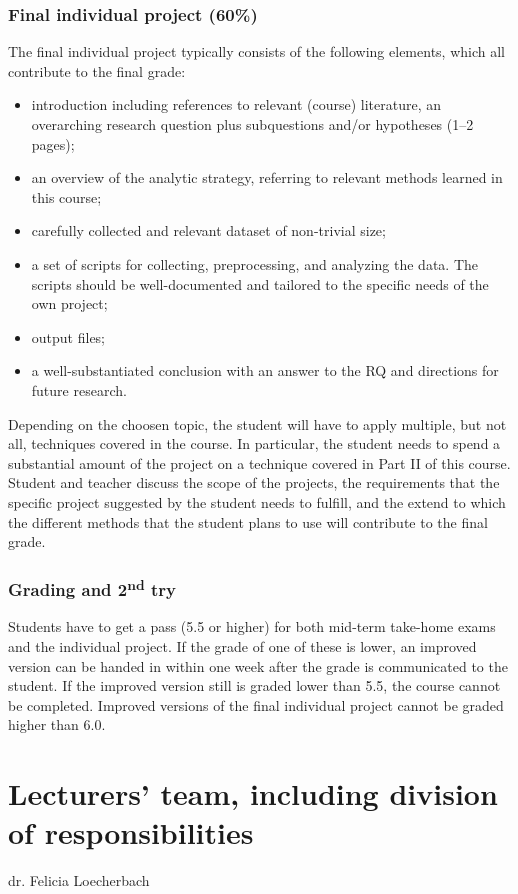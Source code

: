 \documentclass[a4paper,12pt]{report}
\begin{document}
\subsection*{Final individual project (60\%)}
The final individual project typically consists of the following elements, which all contribute to the final grade:
\begin{itemize}
\item introduction including references to relevant (course) literature, an overarching research question plus subquestions and/or hypotheses (1–2 pages);
\item an overview of the analytic strategy, referring to relevant methods learned in this course;
\item carefully collected and relevant dataset of non-trivial size;
\item a set of scripts for collecting, preprocessing, and analyzing the data. The scripts should be well-documented and tailored to the specific needs of the own project;
\item output files;
\item a well-substantiated conclusion with an answer to the RQ and directions for future research.
\end{itemize}

Depending on the choosen topic, the student will have to apply multiple, but not all, techniques covered in the course. In particular, the student needs to spend a substantial amount of the project on a technique covered in Part II of this course. Student and teacher discuss the scope of the projects, the requirements that the specific project suggested by the student needs to fulfill, and the extend to which the different methods that the student plans to use will contribute to the final grade.

\subsection*{Grading and 2\textsuperscript{nd} try}
Students have to get a pass (5.5 or higher) for both mid-term take-home exams and the individual project. If the grade of one of these is lower, an improved version can be handed in within one week after the grade is communicated to the student. If the improved version still is graded lower than 5.5, the course cannot be completed. Improved versions of the final individual project cannot be graded higher than 6.0. 


\chapter{Lecturers' team, including division of responsibilities}
dr. Felicia Loecherbach
\end{document}
